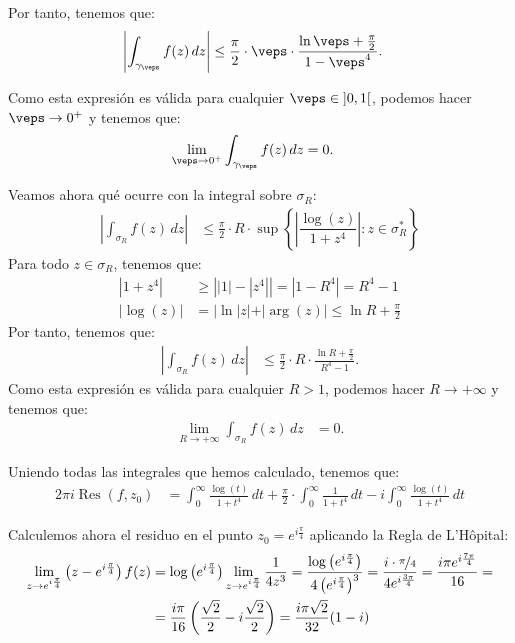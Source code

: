 \documentclass[12pt]{article}
\DeclareMathOperator{\Res}{Res}
\begin{document}
\begin{ejercicio}[2.5 puntos]
    Por tanto, tenemos que:
    \begin{align*}
        \left|\int_{\gamma_{\veps}} f(z) \, dz\right| &\leq \frac{\pi}{2}\cdot \veps \cdot \frac{\ln\veps + \frac{\pi}{2}}{1 - \veps^4}.
    \end{align*}

    Como esta expresión es válida para cualquier $\veps\in \left]0, 1\right[$, podemos hacer $\veps \to 0^+$ y tenemos que:
    \begin{align*}
        \lim_{\veps\to 0^+} \int_{\gamma_{\veps}} f(z) \, dz &= 0.
    \end{align*}

    Veamos ahora qué ocurre con la integral sobre $\sigma_R$:
    \begin{align*}
        \left|\int_{\sigma_R} f(z) \, dz\right| &\leq \frac{\pi}{2}\cdot R \cdot \sup\left\{\left|\dfrac{\log(z)}{1 + z^4}\right| : z\in \sigma_R^*\right\}
    \end{align*}
    Para todo $z\in \sigma_R$, tenemos que:
    \begin{align*}
        |1+z^4| &\geq \left||1| - |z^4|\right| = \left|1 - R^4\right| = R^4 - 1\\
        |\log(z)| &= |\ln|z| + |\arg(z)|\leq \ln R + \frac{\pi}{2}
    \end{align*}
    Por tanto, tenemos que:
    \begin{align*}
        \left|\int_{\sigma_R} f(z) \, dz\right| &\leq \frac{\pi}{2}\cdot R \cdot \frac{\ln R + \frac{\pi}{2}}{R^4 - 1}.
    \end{align*}
    Como esta expresión es válida para cualquier $R > 1$, podemos hacer $R \to +\infty$ y tenemos que:
    \begin{align*}
        \lim_{R\to+\infty} \int_{\sigma_R} f(z) \, dz &= 0.
    \end{align*}

    Uniendo todas las integrales que hemos calculado, tenemos que:
    \begin{align*}
        2\pi i\Res(f, z_0) &= \int_0^{\infty} \frac{\log(t)}{1 + t^4} \, dt + \frac{\pi}{2}\cdot \int_{0}^{\infty} \frac{1}{1 + t^4} \, dt - i\int_0^{\infty} \frac{\log(t)}{1 + t^4} \, dt
    \end{align*}

    Calculemos ahora el residuo en el punto $z_0 = e^{i\frac{\pi}{4}}$ aplicando la Regla de L'Hôpital:
    \begin{align*}
        \lim_{z\to e^{i\frac{\pi}{4}}} \left(z - e^{i\frac{\pi}{4}}\right)f(z) &= \log\left(e^{i\frac{\pi}{4}}\right) \lim_{z\to e^{i\frac{\pi}{4}}} \dfrac{1}{4z^3}
        = \dfrac{\log\left(e^{i\frac{\pi}{4}}\right)}{4\left(e^{i\frac{\pi}{4}}\right)^3}
        = \dfrac{i\cdot \nicefrac{\pi}{4}}{4 e^{i\frac{3\pi}{4}}}
        = \dfrac{i\pi e^{i\frac{7\pi}{4}}}{16}
        =\\&= \dfrac{i\pi}{16}\left(\dfrac{\sqrt{2}}{2} - i\frac{\sqrt{2}}{2}\right)
        = \dfrac{i\pi\sqrt{2}}{32}(1-i)
    \end{align*}


\end{ejercicio}
\end{document}
